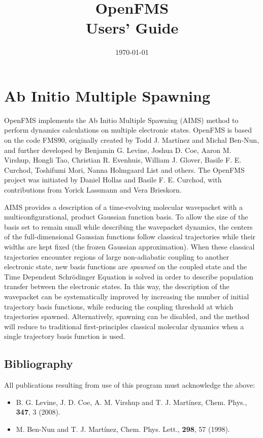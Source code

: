 \documentclass[11pt]{article}
\title{OpenFMS \\ Users' Guide}
\date{\today}
\begin{document}
\maketitle


\newpage
\tableofcontents
\newpage

\section{Ab Initio Multiple Spawning}


OpenFMS implements the Ab Initio Multiple Spawning (AIMS) method to perform dynamics calculations on multiple electronic states. OpenFMS is based on the code FMS90, originally created by Todd J. Mart\'{i}nez and Michal Ben-Nun, and further developed by Benjamin G. Levine, Joshua D. Coe, Aaron M. Virshup, Hongli Tao, Christian R. Evenhuis, William J. Glover, Basile F. E. Curchod, Toshifumi Mori, Nanna Holmgaard List and others. The OpenFMS project was initiated by Daniel Hollas and Basile F. E. Curchod, with contributions from Yorick Lassmann and Vera Brieskorn.

AIMS provides a description of a time-evolving molecular wavepacket with a multiconfigurational, 
product Gaussian function basis. To allow the size of the basis set to remain small while describing 
the wavepacket dynamics, the centers of the full-dimensional Gaussian functions follow classical 
trajectories while their widths are kept fixed (the frozen Gaussian approximation). When these 
classical trajectories encounter regions of large non-adiabatic coupling to another electronic state, 
new basis functions are {\em spawned} on the coupled state and the Time Dependent Schr\"odinger 
Equation is solved in order to describe population transfer between the electronic states. In this way, 
the description of the wavepacket can be systematically improved by increasing the number of initial 
trajectory basis functions, while reducing the coupling threshold at which trajectories spawned. 
Alternatively, spawning can be disabled, and the method will reduce to traditional first-principles 
classical molecular dynamics when a single trajectory basis function is used.

\subsection{Bibliography}
\label{sec:aimsbiblio}
All publications resulting from use of this program must acknowledge
the above:
\begin{itemize}
\item B. G. Levine, J. D. Coe, A. M. Virshup and T. J. Mart\'{i}nez, Chem. Phys., \textbf{347}, 3 (2008).
\item M. Ben-Nun and T. J. Mart\'{i}nez, Chem. Phys. Lett., \textbf{298}, 57 (1998).
\end{itemize}
\end{document}
